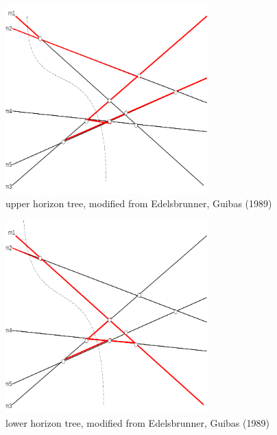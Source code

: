 \documentclass[12pt]{article}
\begin{document}
        \begin{figure}
            \center 
            \includegraphics[width=0.7\textwidth]{uht.png}
            \caption{upper horizon tree, modified from Edelsbrunner, Guibas (1989)}
            \label{figure.uht} 
        \end{figure}

        \begin{figure}
            \center
            \includegraphics[width=0.7\textwidth]{lht.png}
            \caption{lower horizon tree, modified from Edelsbrunner, Guibas (1989)}
            \label{figure.lht}
        \end{figure}

        \newpage

\end{document}
